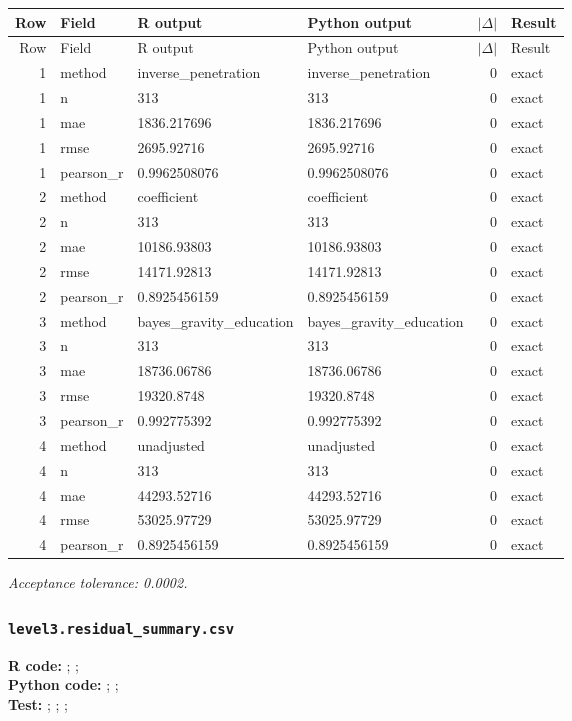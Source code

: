 \documentclass[10pt]{article}
\begin{document}
\small
\begin{longtable}{@{}r p{}p{}p{}rl@{}}
\toprule
Row & Field & R output & Python output & $|\Delta|$ & Result \\
\midrule
\endfirsthead
\toprule
Row & Field & R output & Python output & $|\Delta|$ & Result \\
\midrule
\endhead
1 & method & inverse\_\allowbreak{}penetration & inverse\_\allowbreak{}penetration & 0 & exact \\
1 & n & 313 & 313 & 0 & exact \\
1 & mae & 1836.217696 & 1836.217696 & 0 & exact \\
1 & rmse & 2695.92716 & 2695.92716 & 0 & exact \\
1 & pearson\_\allowbreak{}r & 0.9962508076 & 0.9962508076 & 0 & exact \\
2 & method & coefficient & coefficient & 0 & exact \\
2 & n & 313 & 313 & 0 & exact \\
2 & mae & 10186.93803 & 10186.93803 & 0 & exact \\
2 & rmse & 14171.92813 & 14171.92813 & 0 & exact \\
2 & pearson\_\allowbreak{}r & 0.8925456159 & 0.8925456159 & 0 & exact \\
3 & method & bayes\_\allowbreak{}gravity\_\allowbreak{}education & bayes\_\allowbreak{}gravity\_\allowbreak{}education & 0 & exact \\
3 & n & 313 & 313 & 0 & exact \\
3 & mae & 18736.06786 & 18736.06786 & 0 & exact \\
3 & rmse & 19320.8748 & 19320.8748 & 0 & exact \\
3 & pearson\_\allowbreak{}r & 0.992775392 & 0.992775392 & 0 & exact \\
4 & method & unadjusted & unadjusted & 0 & exact \\
4 & n & 313 & 313 & 0 & exact \\
4 & mae & 44293.52716 & 44293.52716 & 0 & exact \\
4 & rmse & 53025.97729 & 53025.97729 & 0 & exact \\
4 & pearson\_\allowbreak{}r & 0.8925456159 & 0.8925456159 & 0 & exact \\
\bottomrule
\end{longtable}
\normalsize
\textit{Acceptance tolerance: \num{0.0002}.}

\subsubsection{\texorpdfstring{\texttt{level3.residual\_summary.csv}}{level3.residual\_summary.csv}}
{\footnotesize \textbf{R code:} ; ; \\ \textbf{Python code:} ; ; \\ \textbf{Test:} ; ; ; \par}
\end{document}
